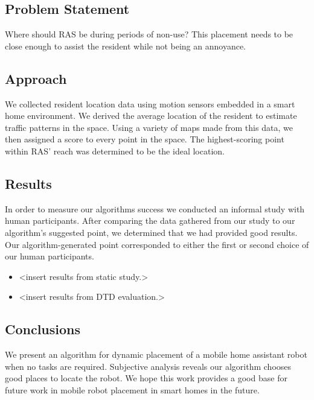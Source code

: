 \documentclass[11pt, draft, a4paper]{IEEEtran}
\begin{document}
\subsection{Problem Statement}
Where should RAS be during periods of non-use? This placement needs to be close enough to assist the resident while not being an annoyance. 


\subsection{Approach}
We collected resident location data using motion sensors embedded in a smart home environment. We derived the average location of the resident to estimate traffic patterns in the space. Using a variety of maps made from this data, we then assigned a score to every point in the space. The highest-scoring point within RAS' reach was determined to be the ideal location.


\subsection{Results}
In order to measure our algorithms success we conducted an informal study with human participants. After comparing the data gathered from our study to our algorithm's suggested point, we determined that we had provided good results. Our algorithm-generated point corresponded to either the first or second choice of our human participants.
\begin{itemize}
    \item \textless insert results from static study.\textgreater 
    \item \textless insert results from DTD evaluation.\textgreater
\end{itemize}


\subsection{Conclusions}
We present an algorithm for dynamic placement of a mobile home assistant robot 
when no tasks are required. Subjective analysis reveals our algorithm chooses 
good places to locate the robot. We hope this work provides a good base for 
future work in mobile robot placement in smart homes in the future.
\end{document}
